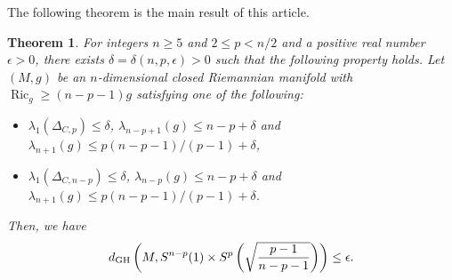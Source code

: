\documentclass[pdftex]{sigma}
\numberwithin{equation}{section}
\newtheorem{Thm}{Theorem}[section]
\theoremstyle{definition}
\newcommand{\Ric}{\operatorname{Ric}}
\begin{document}
The following theorem is the main result of this article.
\begin{Thm}\label{mthm}
For integers $n\geq 5$ and $2\leq p < n/2$ and a positive real number $\epsilon>0$, there exists $\delta=\delta(n,p,\epsilon)>0$ such that the following property holds.
Let $(M,g)$ be an $n$-dimensional closed Riemannian manifold with $\Ric_g\geq (n-p-1)g$
satisfying one of the following:
\begin{itemize}\itemsep=0pt
\item $\lambda_1(\Delta_{C,p})\leq \delta$, $\lambda_{n-p+1}(g)\leq n-p+\delta$ and $\lambda_{n+1}(g)\leq p(n-p-1)/(p-1)+\delta$,
\item $\lambda_1(\Delta_{C,n-p})\leq \delta$, $\lambda_{n-p}(g)\leq n-p+\delta$ and $\lambda_{n+1}(g)\leq p(n-p-1)/(p-1)+\delta$.
\end{itemize}
Then, we have
\[d_{{\rm GH}}\left(M,S^{n-p}(1)\times S^p\left(\sqrt{\frac{p-1}{n-p-1}}\right)\right)\leq \epsilon.\]
\end{Thm}
\end{document}
